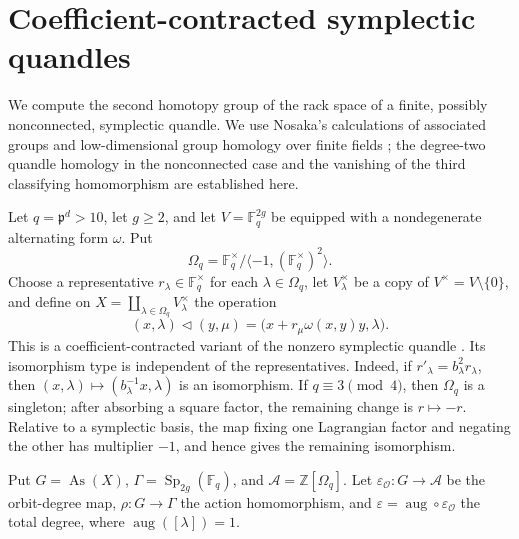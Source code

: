 \documentclass[10pt,a4paper]{amsart}
\DeclareMathOperator{\As}{As}
\newcommand{\ZZ}{\mathbb Z}
\newcommand{\OO}{\mathcal O}
\begin{document}
\section{Coefficient-contracted symplectic quandles}

We compute the second homotopy group of the rack space of a finite, possibly
nonconnected, symplectic quandle. We use Nosaka's calculations of associated
groups and low-dimensional group homology over finite fields
\cite[\S4.2]{NosakaAdjoint}; the degree-two quandle homology in the
nonconnected case and the vanishing of the third classifying homomorphism are
established here.

Let $q=\mathfrak p^d>10$, let $g\ge2$, and let
$V=\mathbb F_q^{2g}$ be equipped with a nondegenerate alternating form
$\omega$. Put
\[
 \Omega_q=\mathbb F_q^\times/
 \langle-1,(\mathbb F_q^\times)^2\rangle.
\]
Choose a representative $r_\lambda\in\mathbb F_q^\times$ for each
$\lambda\in\Omega_q$, let $V_\lambda^\times$ be a copy of
$V^\times=V\setminus\{0\}$, and define on
$X=\coprod_{\lambda\in\Omega_q}V_\lambda^\times$ the operation
\begin{equation}
 (x,\lambda)\lhd(y,\mu)
 =\bigl(x+r_\mu\omega(x,y)y,\lambda\bigr).
\label{eq:symp-operation}
\end{equation}
This is a coefficient-contracted variant of the nonzero symplectic quandle
\cite{NavasNelson}. Its isomorphism type is independent of the representatives.
Indeed, if $r'_\lambda=b_\lambda^2r_\lambda$, then
$(x,\lambda)\mapsto(b_\lambda^{-1}x,\lambda)$ is an isomorphism. If
$q\equiv3\pmod4$, then $\Omega_q$ is a singleton; after absorbing a square
factor, the remaining change is $r\mapsto-r$. Relative to a symplectic basis,
the map fixing one Lagrangian factor and negating the other has multiplier
$-1$, and hence gives the remaining isomorphism.

Put $G=\As(X)$, $\Gamma=\operatorname{Sp}_{2g}(\mathbb F_q)$, and
$\mathcal A=\ZZ[\Omega_q]$. Let
$\varepsilon_{\OO}\colon G\to\mathcal A$ be the orbit-degree map,
$\rho\colon G\to\Gamma$ the action homomorphism, and
$\varepsilon=\operatorname{aug}\circ\varepsilon_{\OO}$ the total degree,
where $\operatorname{aug}([\lambda])=1$.
\end{document}
